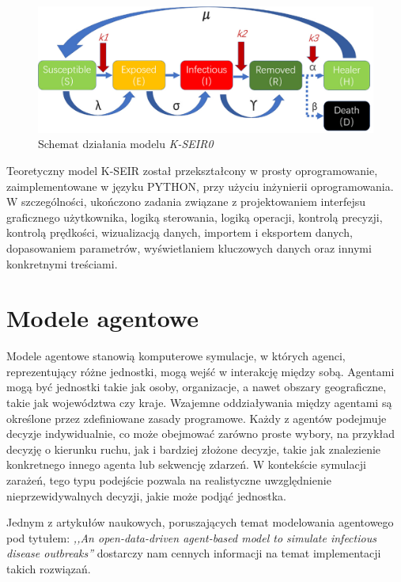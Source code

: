 \begin{figure}[h!]
	\includegraphics[width=\linewidth]{kseirscheme.png}
	\caption{Schemat działania modelu  \textit {K-SEIR0}\cite{bib:artykul} }
\end{figure}

Teoretyczny model K-SEIR został przekształcony w prosty oprogramowanie, zaimplementowane w języku PYTHON, przy użyciu inżynierii oprogramowania. W szczególności, ukończono zadania związane z projektowaniem interfejsu graficznego użytkownika, logiką sterowania, logiką operacji, kontrolą precyzji, kontrolą prędkości, wizualizacją danych, importem i eksportem danych, dopasowaniem parametrów, wyświetlaniem kluczowych danych oraz innymi konkretnymi treściami.
\newpage
\section{\textbf{Modele agentowe}}

Modele agentowe stanowią komputerowe symulacje, w których agenci, reprezentujący różne jednostki, mogą wejść w interakcję między sobą. Agentami mogą być jednostki takie jak osoby, organizacje, a nawet obszary geograficzne, takie jak województwa czy kraje. Wzajemne oddziaływania między agentami są określone przez zdefiniowane zasady programowe. Każdy z agentów podejmuje decyzje indywidualnie, co może obejmować zarówno proste wybory, na przykład decyzję o kierunku ruchu, jak i bardziej złożone decyzje, takie jak znalezienie konkretnego innego agenta lub sekwencję zdarzeń. W kontekście symulacji zarażeń, tego typu podejście pozwala na realistyczne uwzględnienie nieprzewidywalnych decyzji, jakie może podjąć jednostka.

Jednym z artykułów naukowych, poruszających temat modelowania agentowego pod tytułem: \textit{,,An open-data-driven agent-based model to simulate infectious disease outbreaks''} \cite{bib:artykul1} dostarczy nam cennych informacji na  temat implementacji takich rozwiązań. 

